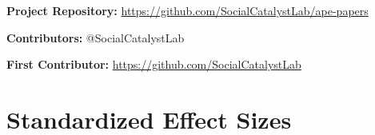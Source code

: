 \documentclass[12pt]{article}
\begin{document}
\noindent\textbf{Project Repository:} \url{https://github.com/SocialCatalystLab/ape-papers}

\noindent\textbf{Contributors:} @SocialCatalystLab

\noindent\textbf{First Contributor:} \url{https://github.com/SocialCatalystLab}

\label{apep_main_text_end}
\newpage



\newpage
\appendix

\section{Standardized Effect Sizes}
\label{sec:sde}


\end{document}
